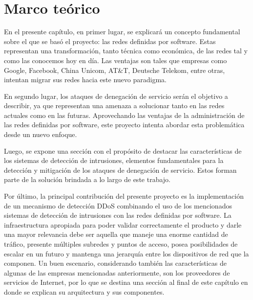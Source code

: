\chapter{Marco teórico} %

\label{Chapter2} %
En el presente capítulo, en primer lugar, se explicará un concepto fundamental
sobre el que se basó el proyecto: las redes definidas por software. Estas
representan una transformación, tanto técnica como económica, de las redes tal y
como las conocemos hoy en día. Las ventajas son tales que empresas como Google,
Facebook, China Unicom, AT\&T, Deutsche Telekom, entre otras, intentan migrar
sus redes hacia este nuevo paradigma.

En segundo lugar, los ataques de denegación de servicio serán el objetivo a
describir, ya que representan una amenaza a solucionar tanto en las redes
actuales como en las futuras. Aprovechando las ventajas de la administración de
las redes definidas por software, este proyecto intenta abordar esta
problemática desde un nuevo enfoque.

Luego, se expone una sección con el propósito de destacar las características de
los sistemas de detección de intrusiones, elementos fundamentales para la
detección y mitigación de los ataques de denegación de servicio. Estos forman
parte de la solución brindada a lo largo de este trabajo.

Por último, la principal contribución del presente proyecto es la implementación de
un mecanismo de detección DDoS combinando el uso de los mencionados sistemas de
detección de intrusiones con las redes definidas por software. La
infraestructura apropiada para poder validar correctamente el producto y darle
una mayor relevancia debe ser aquella que maneje una enorme cantidad de
tráfico, presente múltiples subredes y puntos de acceso, posea posibilidades de
escalar en un futuro y mantenga una jerarquía entre los dispositivos de red que
la componen. Un buen escenario, considerando también las características de
algunas de las empresas mencionadas anteriormente, son los proveedores de
servicios de Internet, por lo que se destina una sección al final de este
capítulo en donde se explican su arquitectura y sus componentes.


